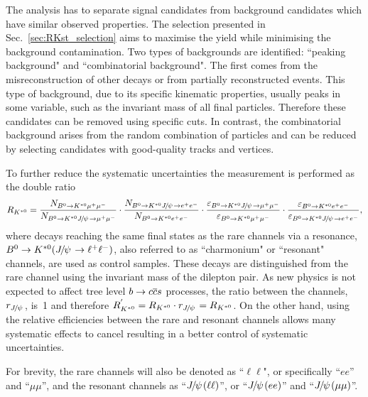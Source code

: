 The analysis has to separate signal candidates from background candidates which have similar observed properties. 
The selection presented in Sec.~\ref{sec:RKst_selection} aims to maximise the yield while minimising
the background contamination. Two types of backgrounds are identified: ``peaking background" and ``combinatorial background". 
The first comes from the misreconstruction of other decays or from partially reconstructed events. This type 
of background, due to its specific kinematic properties, usually peaks in some variable, such as the invariant
mass of all final particles. Therefore these candidates can be removed using specific cuts. 
In contrast, the combinatorial background arises from the random combination of particles and can 
be reduced by selecting candidates with good-quality tracks and vertices.

To further reduce the systematic uncertainties the measurement is performed as the double ratio 
%
\begin{equation}
\label{eq:RKst}
R_{\Kstarz} = 
\frac{N_{\Bz\to\Kstarz \mumu}}{N_{\Bz\to\Kstarz\jpsi\to \mumu}} 
\cdot \frac{N_{\Bz\to\Kstarz \jpsi \to \ee}}{N_{\Bz\to\Kstarz\ee}}
\cdot \frac{\varepsilon_{\Bz\to\Kstarz \jpsi \to \mumu}}{\varepsilon_{\Bz\to\Kstarz \mumu}} 
\cdot \frac{\varepsilon_{\Bz\to\Kstarz \ee}}{\varepsilon_{\Bz\to\Kstarz\jpsi\to \ee}},
\end{equation}
%
where decays reaching the same final states as the rare channels via a \jpsi resonance, $\Bz\to\Kstarz(\jpsi\to\ll)$,
also referred to as ``charmonium" or ``resonant" channels, are used as control samples.
These decays are distinguished from the rare channel using the invariant mass of the dilepton pair.
%
%
As new physics is not expected to affect tree level $b\rightarrow{\ensuremath{c}}{\ensuremath{\overline {{c}}}}{\ensuremath{s}}$ processes, the ratio 
between the \jpsi channels, $r_{\jpsi}$, \mbox{is 1} and therefore \mbox{$\RKst^{'} = \RKst \cdot r_{\jpsi} = \RKst$}.
On the other hand, using the relative efficiencies between the rare and resonant channels
allows many systematic effects to cancel resulting in a better control of systematic uncertainties.  

For brevity, the rare channels will also be denoted as ``$\ell\ell$", or
specifically ``$ee$'' and ``$\mu\mu$'', and the resonant channels as ``$\jpsi(\ell\ell)$'',
or ``$\jpsi(ee)$'' and ``$\jpsi(\mu\mu)$''.

